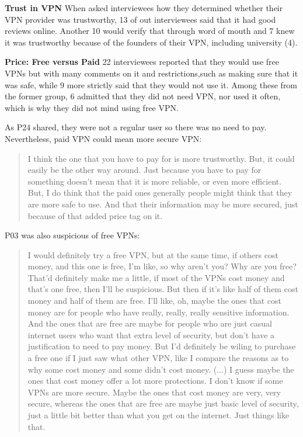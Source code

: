 \textbf{Trust in VPN} When asked interviewees how they determined whether
their VPN provider was trustworthy, 13 of out interviewees said that it had
good reviews online. Another 10 would verify that through word of mouth and 7
knew it was trustworthy because of the founders of their VPN, including
university (4). 

\textbf{Price: Free versus Paid} 22 interviewees reported that they would use free VPNs but with
many comments on it and restrictions,such as making sure that it was safe,
while 9 more strictly said that they would not use it. Among these from the
former group, 6 admitted that they did not need VPN, nor used it often, which
is why they did not mind using free VPN. 

As P24 shared, they were not a regular user so there was no need to pay.
Nevertheless, paid VPN could mean more secure VPN: \begin{quote} I think the
one that you have to pay for is more trustworthy. But, it could easily be the
other way around. Just because you have to pay for something doesn't mean that
it is more reliable, or even more efficient. But, I do think that the paid
ones generally people might think that they are more safe to use. And that
their information may be more secured, just because of that added price tag on
it.\end{quote}

P03 was also suspicious of free VPNs: \begin{quote}I would definitely try a
free VPN, but at the same time, if others cost money, and this one is free,
I'm like, so why aren't you? Why are you free? That'd definitely make me a
little, if most of the VPNs cost money and that's one free, then I'll be
suspicious. But then if it's like half of them cost money and half of them are
free. I'll like, oh, maybe the ones that cost money are for people who have
really, really, really sensitive information. And the ones that are free are
maybe for people who are just casual internet users who want that extra level
of security, but don't have a justification to need to pay money. But I'd
definitely be wiling to purchase a free one if I just saw what other VPN, like
I compare the reasons as to why some cost money and some didn't cost money.
(...) I guess maybe the ones that cost money offer a lot more protections. I
don't know if some VPNs are more secure. Maybe the ones that cost money are
very, very secure, whereas the ones that are free are maybe just basic level
of security, just a little bit better than what you get on the internet. Just
things like that.\end{quote}

